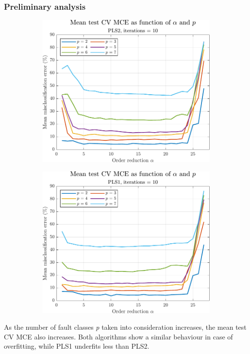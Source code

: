 \begin{frame}
	\frametitle{Preliminary analysis}
	\begin{figure}
		\centering
		\begin{subfigure}[b]{0.49\textwidth}
			\includegraphics[width=\textwidth]{Images/trend_alpha_p_PLS2.pdf}
		\end{subfigure}
		\hfill
		\begin{subfigure}[b]{0.49\textwidth}
			\includegraphics[width=\textwidth]{Images/trend_alpha_p_PLS1.pdf}
		\end{subfigure}
	\end{figure}
	As the number of fault classes \textit{p} taken into consideration increases, the mean test CV MCE also increases. Both algorithms show a similar behaviour in case of overfitting, while PLS1 underfits less than PLS2. 
\end{frame}

